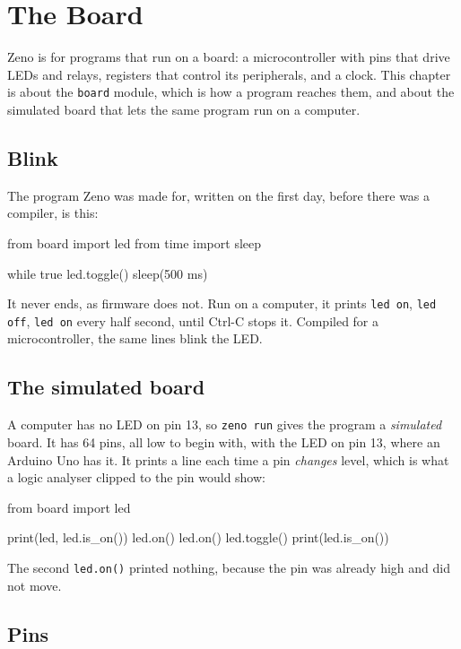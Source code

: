\chapter{The Board}\label{ch-board}

Zeno is for programs that run on a board: a microcontroller with pins
that drive LEDs and relays, registers that control its peripherals,
and a clock. This chapter is about the \verb|board| module, which is
how a program reaches them, and about the simulated board that lets
the same program run on a computer.

\section{Blink}

The program Zeno was made for, written on the first day, before there
was a compiler, is this:

\begin{zenofrag}[file=blink.zeno]
from board import led
from time import sleep

while true {
    led.toggle()
    sleep(500 ms)
}
\end{zenofrag}

It never ends, as firmware does not. Run on a computer, it prints
\verb|led on|, \verb|led off|, \verb|led on| every half second, until
Ctrl-C stops it. Compiled for a microcontroller, the same lines blink
the LED.

\section{The simulated board}

A computer has no LED on pin 13, so \verb|zeno run| gives the program
a \emph{simulated} board. It has 64 pins, all low to begin with, with
the LED on pin 13, where an Arduino Uno has it. It prints a line each
time a pin \emph{changes} level, which is what a logic analyser
clipped to the pin would show:

\begin{zeno}
from board import led

print(led, led.is_on())
led.on()
led.on()
led.toggle()
print(led.is_on())
\end{zeno}

The second \verb|led.on()| printed nothing, because the pin was
already high and did not move.

\section{Pins}

